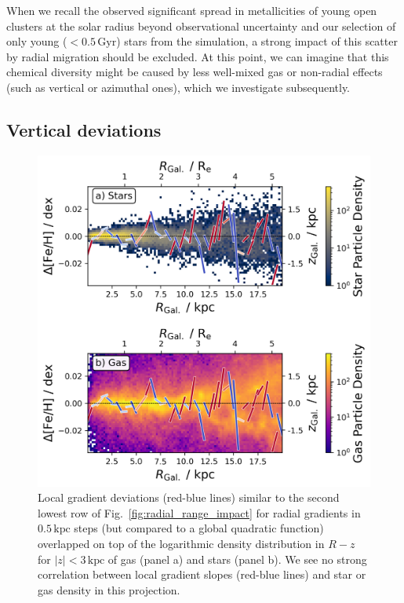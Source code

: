 \documentclass[twocolumn,apj,numberedappendix,appendixfloats]{openjournal}
\newcommand{\nihaoAGEmax}{$0.5\,\mathrm{Gyr}$}
\begin{document}
\begin{CJK*}{UTF8}{gbsn}
When we recall the observed significant spread in metallicities of young open clusters at the solar radius beyond observational uncertainty \citep[e.g.][]{Donor2020, Spina2021} and our selection of only young ($<$\nihaoAGEmax) stars from the simulation, a strong impact of this scatter by radial migration should be excluded. At this point, we can imagine that this chemical diversity might be caused by less well-mixed gas or non-radial effects (such as vertical or azimuthal ones), which we investigate subsequently.

\subsection{Vertical deviations}
\label{sec:coherence_vertical_radial_metallicity_gradients}

\begin{figure}
    \centering
    \includegraphics[width=\columnwidth]{figures/overlap_local_variation_gas.png}
    \caption{Local gradient deviations (red-blue lines) similar to the second lowest row of Fig.~\ref{fig:radial_range_impact} for radial gradients in $0.5\,\mathrm{kpc}$ steps (but compared to a global quadratic function) overlapped on top of the logarithmic density distribution in $R-z$ for $\vert z \vert < 3\,\mathrm{kpc}$ of gas (panel a) and stars (panel b). We see no strong correlation between local gradient slopes (red-blue lines) and star or gas density in this projection.}
    \label{fig:overlap_local_variation_gas}
\end{figure}


\end{CJK*}
\end{document}
